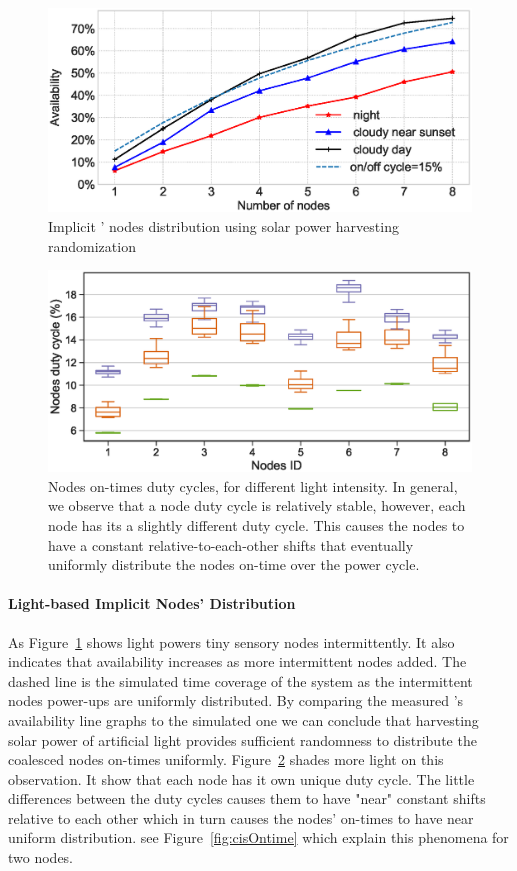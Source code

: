 \begin{figure}[t]
		\centering
		\includegraphics[width=\columnwidth]{figures/sysAvailability}
		\caption{Implicit \fullsys' nodes distribution using solar power harvesting randomization}
		\label{fig:solarPwrCoIS}
\end{figure} 
%
\begin{figure}[t]
		\centering
		\includegraphics[width=\columnwidth]{figures/natural_light_nodes_duty_cycles.eps}
		\caption{Nodes on-times duty cycles, for different light intensity. In general, we observe that a node duty cycle is relatively stable, however, each node has its a slightly different duty cycle. This causes the nodes to have a constant relative-to-each-other shifts that eventually uniformly distribute the nodes on-time over the \sys power cycle.}
		\label{fig:sysDutyCycle}
\end{figure} 

\paragraph{Light-based Implicit Nodes' Distribution}
As Figure~\ref{fig:solarPwrCoIS} shows light powers tiny sensory nodes intermittently. It also indicates that \sys availability increases as more intermittent nodes added. The dashed line is the simulated time coverage of the system as the intermittent nodes power-ups are uniformly distributed. By comparing the measured \sys's availability line graphs to the simulated one we can conclude that harvesting solar power of artificial light provides sufficient randomness to distribute the coalesced nodes on-times uniformly. Figure~\ref{fig:sysDutyCycle} shades more light on this observation. It show that each node has it own unique duty cycle. The little differences between the duty cycles causes them to have "near" constant shifts relative to each other which in turn causes the \sys nodes' on-times to have near uniform distribution. see Figure~\ref{fig:cisOntime} which explain this phenomena for two nodes.

